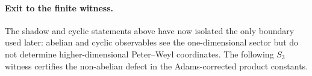 


\paragraph{Exit to the finite witness.}
The shadow and cyclic statements above have now isolated the only boundary
used later: abelian and cyclic observables see the one-dimensional sector but
do not determine higher-dimensional Peter--Weyl coordinates.  The following
\(S_3\) witness certifies the non-abelian defect in the Adams-corrected
product constants.

